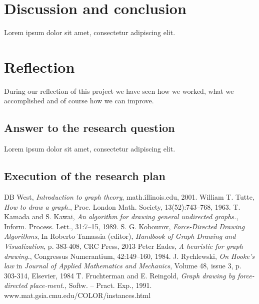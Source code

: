 \documentclass[a4paper,12pt,twoside]{article}
\begin{document}
\section{Discussion and conclusion}
Lorem ipsum dolor sit amet, consectetur adipiscing elit.

\section{Reflection}
During our reflection of this project we have seen how we worked, what we accomplished and of course how we can improve. 
\subsection{Answer to the research question}
Lorem ipsum dolor sit amet, consectetur adipiscing elit.
\subsection{Execution of the research plan}


\begin{thebibliography}{99}
DB West, \emph{Introduction to graph theory}, math.illinois.edu, 2001.
William T. Tutte, \emph{How to draw a graph.}, Proc. London Math. Society, 13(52):743–768, 1963.
T. Kamada and S. Kawai, \emph{An algorithm for drawing general undirected graphs.}, Inform. Process. Lett., 31:7–15, 1989.
S. G. Kobourov, \emph{Force-Directed Drawing Algorithms}, In Roberto Tamassia (editor), \emph{Handbook of Graph Drawing and Visualization}, p. 383-408, CRC Press, 2013
 Peter Eades, \emph{A heuristic for graph drawing.}, Congressus Numerantium, 42:149–160, 1984.
 J. Rychlewski, \emph{On Hooke's law} in \emph{Journal of Applied Mathematics and Mechanics}, Volume 48, issue 3, p. 303-314, Elsevier, 1984
T. Fruchterman and E. Reingold, \emph{Graph drawing by force-directed place-ment.}, Softw. – Pract. Exp., 1991.
 www.mat.gsia.cmu.edu/COLOR/instances.html
\end{thebibliography}
\end{document}
